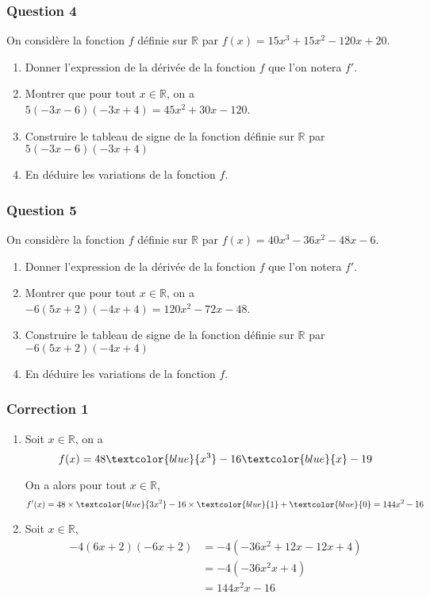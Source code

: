 \documentclass[15pt, mathserif]{beamer}
\newcommand{\R}{\mathbb{R}}			%
\begin{document}
\begin{frame} 
	\frametitle{Question 4}
On considère la fonction $f$ définie sur $\R$ par $f(x)=15x^3 +15x^2-120x+20$. \begin{enumerate} 
 	 \item Donner l'expression de la dérivée de la fonction $f$ que l'on notera $f'$. 
 	 \item Montrer que pour tout $x \in \R$, on a $5(-3x-6)(-3x+4)=45x^2+30x-120$. 
 	 \item Construire le tableau de signe de la fonction définie sur $\R$ par 
 \hfil$5(-3x-6)(-3x+4)$ 
 	 \item En déduire les variations de la fonction $f$. 
 
 \end{enumerate} 
 
 \end{frame}


\begin{frame} 
	\frametitle{Question 5}
On considère la fonction $f$ définie sur $\R$ par $f(x)=40x^3 -36x^2-48x-6$. \begin{enumerate} 
 	 \item Donner l'expression de la dérivée de la fonction $f$ que l'on notera $f'$. 
 	 \item Montrer que pour tout $x \in \R$, on a $-6(5x+2)(-4x+4)=120x^2-72x-48$. 
 	 \item Construire le tableau de signe de la fonction définie sur $\R$ par 
 \hfil$-6(5x+2)(-4x+4)$ 
 	 \item En déduire les variations de la fonction $f$. 
 
 \end{enumerate} 
 
 \end{frame}


\begin{frame}
\vspace{-10mm}
	\frametitle{Correction 1}
\begin{enumerate} 
 	 \item Soit $x \in \R$, on a $$f(x)=48\textcolor{blue}{x^3}-16\textcolor{blue}{x}-19$$
 
 On a alors pour tout $x \in  \R$, $$f'(x)= 48\times \textcolor{blue}{3x^2}-16\times \textcolor{blue}{1}+\textcolor{blue}{0}=144x^2-16$$
 	 \item Soit $x \in \R$, \begin{align*} 
 -4(6x+2)(-6x+2) & = -4\left( -36x^2 +12x -12x +4\right) \\ 
 &=  -4\left( -36x^2 x +4\right) \\ 
 &= 144x^2 x -16
 \end{align*} \end{enumerate} 
 
 \end{frame} 
 
\end{document}
